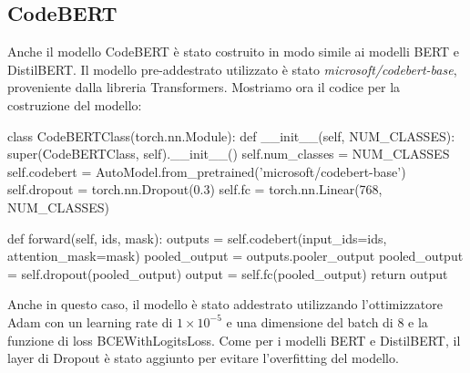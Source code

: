 \documentclass[../../Thesis.tex]{subfiles}
\begin{document}
\subsection{CodeBERT}
Anche il modello CodeBERT è stato costruito in modo simile ai modelli BERT e DistilBERT. Il modello pre-addestrato utilizzato è stato \textit{microsoft/codebert-base}, proveniente dalla libreria Transformers. Mostriamo ora il codice per la costruzione del modello:
\begin{python}
    class CodeBERTClass(torch.nn.Module):
        def __init__(self, NUM_CLASSES):
            super(CodeBERTClass, self).__init__()
            self.num_classes = NUM_CLASSES
            self.codebert = AutoModel.from_pretrained('microsoft/codebert-base')
            self.dropout = torch.nn.Dropout(0.3)
            self.fc = torch.nn.Linear(768, NUM_CLASSES)
        
        def forward(self, ids, mask):
            outputs = self.codebert(input_ids=ids, attention_mask=mask)
            pooled_output = outputs.pooler_output
            pooled_output = self.dropout(pooled_output)
            output = self.fc(pooled_output)
            return output
\end{python}
Anche in questo caso, il modello è stato addestrato utilizzando l'ottimizzatore Adam con un learning rate di $1 \times 10^{-5}$ e una dimensione del batch di 8 e la funzione di loss BCEWithLogitsLoss. Come per i modelli BERT e DistilBERT, il layer di Dropout è stato aggiunto per evitare l'overfitting del modello.
\end{document}
